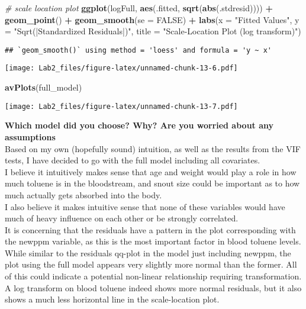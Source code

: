 \documentclass[
]{article}
\newenvironment{Shaded}{\begin{snugshade}}{\end{snugshade}}
\newcommand{\AttributeTok}[1]{\textcolor[rgb]{0.13,0.29,0.53}{#1}}
\newcommand{\CommentTok}[1]{\textcolor[rgb]{0.56,0.35,0.01}{\textit{#1}}}
\newcommand{\ConstantTok}[1]{\textcolor[rgb]{0.56,0.35,0.01}{#1}}
\newcommand{\FunctionTok}[1]{\textcolor[rgb]{0.13,0.29,0.53}{\textbf{#1}}}
\newcommand{\NormalTok}[1]{#1}
\newcommand{\SpecialCharTok}[1]{\textcolor[rgb]{0.81,0.36,0.00}{\textbf{#1}}}
\newcommand{\StringTok}[1]{\textcolor[rgb]{0.31,0.60,0.02}{#1}}
\begin{document}
\begin{Shaded}
\begin{Highlighting}[]
\CommentTok{\# scale location plot}
\FunctionTok{ggplot}\NormalTok{(logFull, }\FunctionTok{aes}\NormalTok{(.fitted, }\FunctionTok{sqrt}\NormalTok{(}\FunctionTok{abs}\NormalTok{(.stdresid)))) }\SpecialCharTok{+}
  \FunctionTok{geom\_point}\NormalTok{() }\SpecialCharTok{+}
  \FunctionTok{geom\_smooth}\NormalTok{(}\AttributeTok{se =} \ConstantTok{FALSE}\NormalTok{) }\SpecialCharTok{+}
  \FunctionTok{labs}\NormalTok{(}\AttributeTok{x =} \StringTok{"Fitted Values"}\NormalTok{, }\AttributeTok{y =} \StringTok{"Sqrt(|Standardized Residuals|)"}\NormalTok{, }\AttributeTok{title =} \StringTok{"Scale{-}Location Plot (log transform)"}\NormalTok{)}
\end{Highlighting}
\end{Shaded}

\begin{verbatim}
## `geom_smooth()` using method = 'loess' and formula = 'y ~ x'
\end{verbatim}

\texttt{[image: Lab2\_files/figure-latex/unnamed-chunk-13-6.pdf]}

\begin{Shaded}
\begin{Highlighting}[]
\FunctionTok{avPlots}\NormalTok{(full\_model)}
\end{Highlighting}
\end{Shaded}

\texttt{[image: Lab2\_files/figure-latex/unnamed-chunk-13-7.pdf]}

\textbf{Which model did you choose? Why? Are you worried about any
assumptions}\\
Based on my own (hopefully sound) intuition, as well as the results from
the VIF tests, I have decided to go with the full model including all
covariates.\\
I believe it intuitively makes sense that age and weight would play a
role in how much toluene is in the bloodstream, and snout size could be
important as to how much actually gets absorbed into the body.\\
I also believe it makes intuitive sense that none of these variables
would have much of heavy influence on each other or be strongly
correlated.\\
It is concerning that the residuals have a pattern in the plot
corresponding with the newppm variable, as this is the most important
factor in blood toluene levels. While similar to the residuals qq-plot
in the model just including newppm, the plot using the full model
appears very slightly more normal than the former. All of this could
indicate a potential non-linear relationship requiring transformation. A
log transform on blood toluene indeed shows more normal residuals, but
it also shows a much less horizontal line in the scale-location plot.
\end{document}
